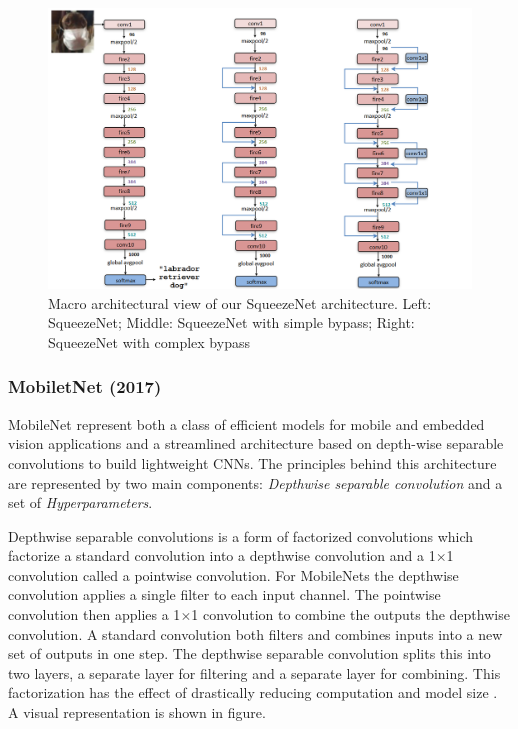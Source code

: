\documentclass{article}
\begin{document}
        \begin{figure}[H]
          \includegraphics[scale=0.3]{../Images/squeezenetarch.png}
          \centering
          \caption{Macro architectural view of our SqueezeNet architecture. Left: SqueezeNet;
          Middle: SqueezeNet with simple bypass; Right: SqueezeNet with complex bypass}
        \end{figure}
      \subsubsection{MobiletNet (2017)}
        MobileNet represent both a class of efficient models for mobile and embedded vision applications and a streamlined architecture based on depth-wise separable convolutions to build lightweight CNNs.
        The principles behind this architecture are represented by two main components: \emph{Depthwise separable convolution} and a set of \emph{Hyperparameters}.

        Depthwise separable convolutions is a form of factorized convolutions which factorize a standard convolution into a depthwise
        convolution and a 1$\times$1 convolution called a pointwise convolution. For MobileNets the depthwise convolution applies a single filter to each input channel. The pointwise
        convolution then applies a 1$\times$1 convolution to combine the outputs the depthwise convolution. A standard convolution both filters and combines inputs into a new set of outputs
        in one step. The depthwise separable convolution splits this into two layers, a separate layer for filtering and a separate
        layer for combining. This factorization has the effect of drastically reducing computation and model size \cite{MNet}. A visual representation is shown in figure.
\end{document}
